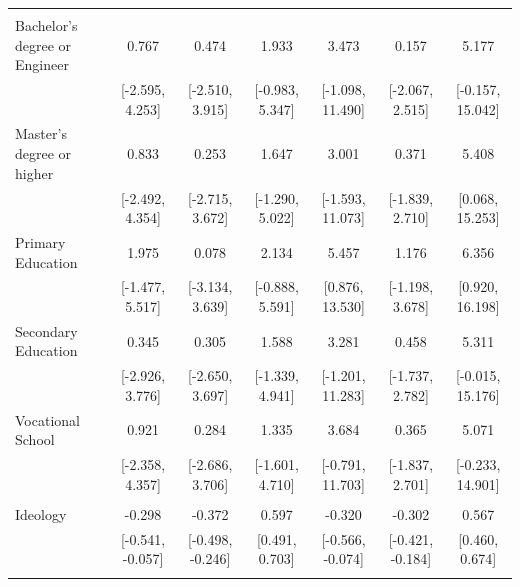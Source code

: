 \documentclass[
  10,
  letterpaper,
  DIV=11,
  numbers=noendperiod]{scrartcl}
\begin{document}
\begin{table}
\begin{tabular}[t]{lcccccc}
\addlinespace[0.3em]
\multicolumn{7}{l}{\cellcolor[HTML]{3498DB}{\textbf{Education}}}\\
\hspace{1em}Bachelor's degree or Engineer & 0.767 & 0.474 & 1.933 & 3.473 & 0.157 & 5.177\\
\hspace{1em} & {}[-2.595, 4.253] & {}[-2.510, 3.915] & {}[-0.983, 5.347] & {}[-1.098, 11.490] & {}[-2.067, 2.515] & {}[-0.157, 15.042]\\
\hspace{1em}Master's degree or higher & 0.833 & 0.253 & 1.647 & 3.001 & 0.371 & 5.408\\
\hspace{1em} & {}[-2.492, 4.354] & {}[-2.715, 3.672] & {}[-1.290, 5.022] & {}[-1.593, 11.073] & {}[-1.839, 2.710] & {}[0.068, 15.253]\\
\hspace{1em}Primary Education & 1.975 & 0.078 & 2.134 & 5.457 & 1.176 & 6.356\\
\hspace{1em} & {}[-1.477, 5.517] & {}[-3.134, 3.639] & {}[-0.888, 5.591] & {}[0.876, 13.530] & {}[-1.198, 3.678] & {}[0.920, 16.198]\\
\hspace{1em}Secondary Education & 0.345 & 0.305 & 1.588 & 3.281 & 0.458 & 5.311\\
\hspace{1em} & {}[-2.926, 3.776] & {}[-2.650, 3.697] & {}[-1.339, 4.941] & {}[-1.201, 11.283] & {}[-1.737, 2.782] & {}[-0.015, 15.176]\\
\hspace{1em}Vocational School & 0.921 & 0.284 & 1.335 & 3.684 & 0.365 & 5.071\\
\hspace{1em} & {}[-2.358, 4.357] & {}[-2.686, 3.706] & {}[-1.601, 4.710] & {}[-0.791, 11.703] & {}[-1.837, 2.701] & {}[-0.233, 14.901]\\
\addlinespace[0.3em]
\multicolumn{7}{l}{\cellcolor[HTML]{3498DB}{\textbf{Ideology}}}\\
\hspace{1em}Ideology & -0.298 & -0.372 & 0.597 & -0.320 & -0.302 & 0.567\\
\hspace{1em} & {}[-0.541, -0.057] & {}[-0.498, -0.246] & {}[0.491, 0.703] & {}[-0.566, -0.074] & {}[-0.421, -0.184] & {}[0.460, 0.674]\\
\addlinespace[0.3em]
\multicolumn{7}{l}{\cellcolor[HTML]{3498DB}{\textbf{Minority}}}\\

\end{tabular}
\end{table}
\end{document}
